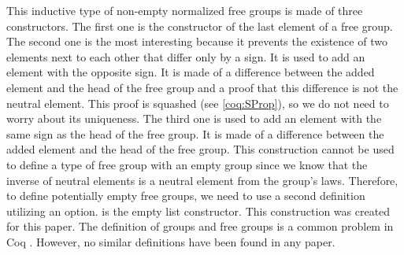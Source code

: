 This inductive type  of non-empty normalized free groups is made of three constructors. The first one  is the constructor of the last element of a free group. The second one  is the most interesting because it prevents the existence of two elements next to each other that differ only by a sign. It is used to add an element with the opposite sign. It is made of a difference between the added element and the head of the free group and a proof that this difference is not the neutral element. This proof is squashed (see \ref{coq:SProp}), so we do not need to worry about its uniqueness. The third one  is used to add an element with the same sign as the head of the free group. It is made of a difference between the added element and the head of the free group. This construction cannot be used to define a type of free group with an empty group since we know that the inverse of neutral elements is a neutral element from the group's laws. Therefore, to define potentially empty free groups, we need to use a second definition utilizing an option.  is the empty list constructor. This construction was created for this paper. The definition of groups and free groups is a common problem in Coq \cite{GroupsCoq} \cite{FreeGroupsCoq}. However, no similar definitions have been found in any paper. 

